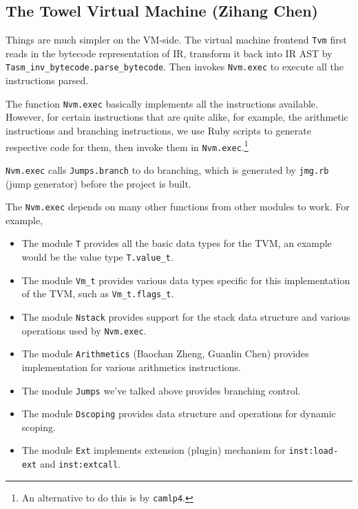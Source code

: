 \documentclass{report}
\newcommand{\inst}[1] {\texttt{inst:#1}}
\begin{document}
\subsection{The Towel Virtual Machine (Zihang Chen)}

Things are much simpler on the VM-side. The virtual machine frontend \texttt{Tvm} first reads in the bytecode representation of IR, transform it back into IR AST by \texttt{Tasm\_inv\_bytecode.parse\_bytecode}. Then invokes \texttt{Nvm.exec} to execute all the instructions parsed.

The function \texttt{Nvm.exec} basically implements all the instructions available. However, for certain instructions that are quite alike, for example, the arithmetic instructions and branching instructions, we use Ruby scripts to generate respective code for them, then invoke them in \texttt{Nvm.exec}.\footnote{An alternative to do this is by \texttt{camlp4}.}

\begin{mdframed}[style=example]
  \texttt{Nvm.exec} calls \texttt{Jumps.branch} to do branching, which is generated by \texttt{jmg.rb} (jump generator) before the project is built.
\end{mdframed}

\begin{mdframed}[style=detail]
The \texttt{Nvm.exec} depends on many other functions from other modules to work. For example,

\begin{itemize}
\item The module \texttt{T} provides all the basic data types for the TVM, an example would be the value type \texttt{T.value\_t}.

\item The module \texttt{Vm\_t} provides various data types specific for this implementation of the TVM, such as \texttt{Vm\_t.flags\_t}.

\item The module \texttt{Nstack} provides support for the stack data
  structure and various operations used by \texttt{Nvm.exec}.

\item The module \texttt{Arithmetics} (Baochan Zheng, Guanlin Chen) provides implementation for various arithmetics instructions.

\item The module \texttt{Jumps} we've talked above provides branching control.

\item The module \texttt{Dscoping} provides data structure and operations for dynamic scoping.

\item The module \texttt{Ext} implements extension (plugin) mechanism for \inst{load-ext} and \inst{extcall}.
\end{itemize}
\end{mdframed}
\end{document}
